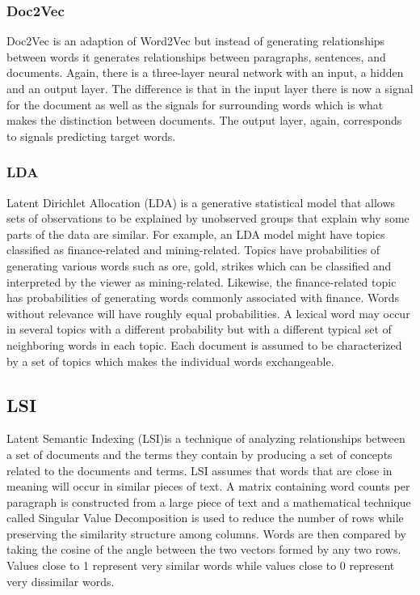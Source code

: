 \documentclass[11pt]{article}
\begin{document}
\hypertarget{doc2vec}{%
\subsubsection{Doc2Vec}\label{doc2vec}}

Doc2Vec is an adaption of Word2Vec but instead of generating
relationships between words it generates relationships between
paragraphs, sentences, and documents. Again, there is a three-layer
neural network with an input, a hidden and an output layer. The
difference is that in the input layer there is now a signal for the
document as well as the signals for surrounding words which is what
makes the distinction between documents. The output layer, again,
corresponds to signals predicting target words.

\hypertarget{lda}{%
\subsubsection{LDA}\label{lda}}

Latent Dirichlet Allocation (LDA) is a generative statistical model that
allows sets of observations to be explained by unobserved groups that
explain why some parts of the data are similar. For example, an LDA
model might have topics classified as finance-related and
mining-related. Topics have probabilities of generating various words
such as ore, gold, strikes which can be classified and interpreted by
the viewer as mining-related. Likewise, the finance-related topic has
probabilities of generating words commonly associated with finance.
Words without relevance will have roughly equal probabilities. A lexical
word may occur in several topics with a different probability but with a
different typical set of neighboring words in each topic. Each document
is assumed to be characterized by a set of topics which makes the
individual words exchangeable.

\hypertarget{lsi}{%
\subsection{LSI}\label{lsi}}

Latent Semantic Indexing (LSI)is a technique of analyzing relationships
between a set of documents and the terms they contain by producing a set
of concepts related to the documents and terms. LSI assumes that words
that are close in meaning will occur in similar pieces of text. A matrix
containing word counts per paragraph is constructed from a large piece
of text and a mathematical technique called Singular Value Decomposition
is used to reduce the number of rows while preserving the similarity
structure among columns. Words are then compared by taking the cosine of
the angle between the two vectors formed by any two rows. Values close
to 1 represent very similar words while values close to 0 represent very
dissimilar words.
\end{document}
